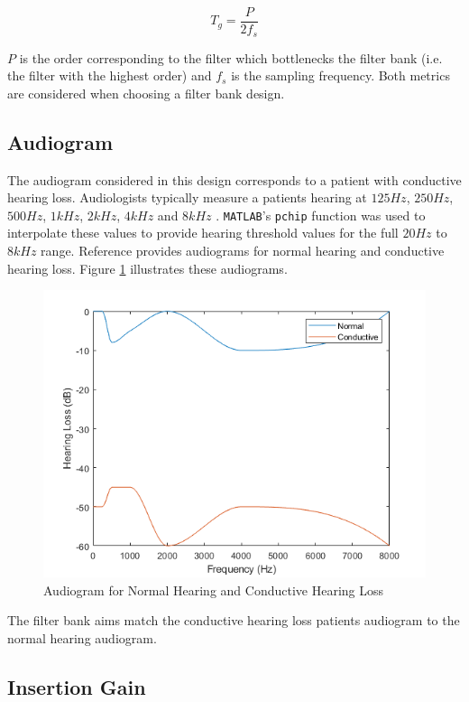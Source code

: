 \documentclass[12pt, onecolumn]{article}
\begin{document}
\begin{equation}
\label{eqn:grpDelay}
T_g = \frac{P}{2f_s}
\end{equation}

\noindent $P$ is the order corresponding to the filter which bottlenecks the filter bank (i.e. the filter with the highest order) and $f_s$ is the sampling frequency. Both metrics are considered when choosing a filter bank design.

\subsection{Audiogram}
\label{sec:audiogram}

\noindent The audiogram considered in this design corresponds to a patient with conductive hearing loss. Audiologists typically measure a patients hearing at $125Hz$, $250Hz$, $500Hz$, $1kHz$, $2kHz$, $4kHz$ and $8kHz$ \cite{mahmoud}. \texttt{MATLAB}'s \texttt{pchip} function was used to interpolate these values to provide hearing threshold values for the full $20Hz$ to $8kHz$ range. Reference \cite{mahmoud} provides audiograms for normal hearing and conductive hearing loss. Figure \ref{fig:normCondAudio} illustrates these audiograms.

\begin{figure}[h]
\centering
\includegraphics[width=0.6\linewidth]{normCondAudiogram.PNG}
\caption{Audiogram for Normal Hearing and Conductive Hearing Loss}
\label{fig:normCondAudio}
\end{figure}  

\noindent The filter bank aims match the conductive hearing loss patients audiogram to the normal hearing audiogram.

\subsection{Insertion Gain}
\label{sec:insertGain}
\end{document}
